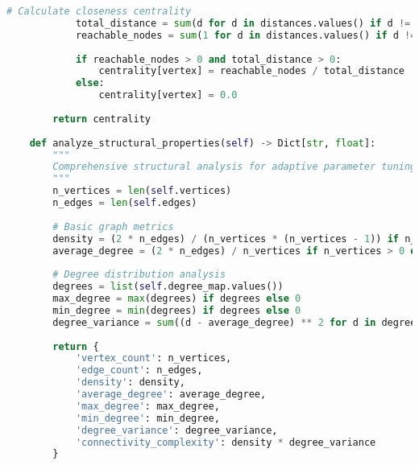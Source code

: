 \begin{lstlisting}[language=Python, caption=Complete Graph Structure Analyzer Implementation]
            # Calculate closeness centrality
            total_distance = sum(d for d in distances.values() if d != float('inf'))
            reachable_nodes = sum(1 for d in distances.values() if d != float('inf')) - 1
            
            if reachable_nodes > 0 and total_distance > 0:
                centrality[vertex] = reachable_nodes / total_distance
            else:
                centrality[vertex] = 0.0
        
        return centrality
    
    def analyze_structural_properties(self) -> Dict[str, float]:
        """
        Comprehensive structural analysis for adaptive parameter tuning.
        """
        n_vertices = len(self.vertices)
        n_edges = len(self.edges)
        
        # Basic graph metrics
        density = (2 * n_edges) / (n_vertices * (n_vertices - 1)) if n_vertices > 1 else 0
        average_degree = (2 * n_edges) / n_vertices if n_vertices > 0 else 0
        
        # Degree distribution analysis
        degrees = list(self.degree_map.values())
        max_degree = max(degrees) if degrees else 0
        min_degree = min(degrees) if degrees else 0
        degree_variance = sum((d - average_degree) ** 2 for d in degrees) / len(degrees) if degrees else 0
        
        return {
            'vertex_count': n_vertices,
            'edge_count': n_edges,
            'density': density,
            'average_degree': average_degree,
            'max_degree': max_degree,
            'min_degree': min_degree,
            'degree_variance': degree_variance,
            'connectivity_complexity': density * degree_variance
        }
\end{lstlisting}
